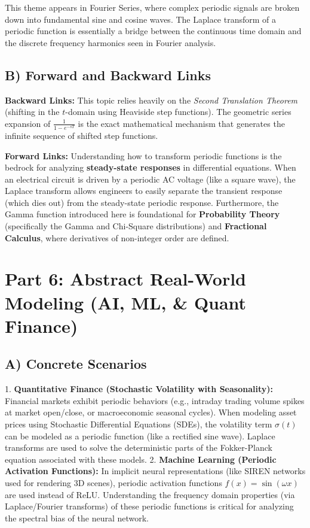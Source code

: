 \documentclass[11pt, letterpaper]{article}
\theoremstyle{definition}
\theoremstyle{remark}
\begin{document}
This theme appears in Fourier Series, where complex periodic signals are broken down into fundamental sine and cosine waves. The Laplace transform of a periodic function is essentially a bridge between the continuous time domain and the discrete frequency harmonics seen in Fourier analysis.

\subsection{B) Forward and Backward Links}
\textbf{Backward Links:} This topic relies heavily on the \textit{Second Translation Theorem} (shifting in the $t$-domain using Heaviside step functions). The geometric series expansion of $\frac{1}{1-e^{-sT}}$ is the exact mathematical mechanism that generates the infinite sequence of shifted step functions.

\textbf{Forward Links:} Understanding how to transform periodic functions is the bedrock for analyzing \textbf{steady-state responses} in differential equations. When an electrical circuit is driven by a periodic AC voltage (like a square wave), the Laplace transform allows engineers to easily separate the transient response (which dies out) from the steady-state periodic response. Furthermore, the Gamma function introduced here is foundational for \textbf{Probability Theory} (specifically the Gamma and Chi-Square distributions) and \textbf{Fractional Calculus}, where derivatives of non-integer order are defined.

\newpage
\section{Part 6: Abstract Real-World Modeling (AI, ML, \& Quant Finance)}

\subsection{A) Concrete Scenarios}
1. \textbf{Quantitative Finance (Stochastic Volatility with Seasonality):} Financial markets exhibit periodic behaviors (e.g., intraday trading volume spikes at market open/close, or macroeconomic seasonal cycles). When modeling asset prices using Stochastic Differential Equations (SDEs), the volatility term $\sigma(t)$ can be modeled as a periodic function (like a rectified sine wave). Laplace transforms are used to solve the deterministic parts of the Fokker-Planck equation associated with these models.
2. \textbf{Machine Learning (Periodic Activation Functions):} In implicit neural representations (like SIREN networks used for rendering 3D scenes), periodic activation functions $f(x) = \sin(\omega x)$ are used instead of ReLU. Understanding the frequency domain properties (via Laplace/Fourier transforms) of these periodic functions is critical for analyzing the spectral bias of the neural network.
\end{document}
